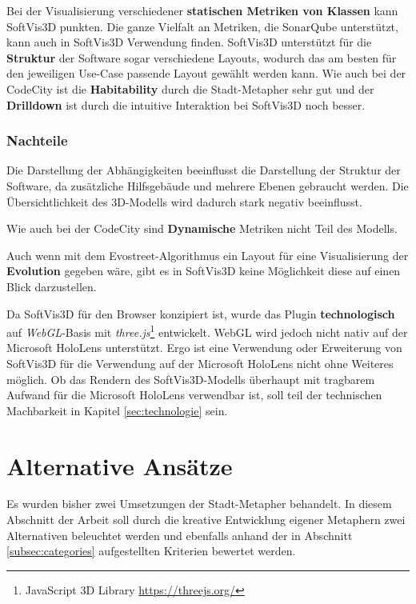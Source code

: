 Bei der Visualisierung verschiedener \textbf{statischen Metriken von Klassen} kann SoftVis3D punkten. Die ganze Vielfalt an Metriken, die SonarQube unterstützt, kann auch in SoftVis3D Verwendung finden. SoftVis3D unterstützt für die \textbf{Struktur} der Software sogar verschiedene Layouts, wodurch das am besten für den jeweiligen Use-Case passende Layout gewählt werden kann. Wie auch bei der CodeCity ist die \textbf{Habitability} durch die Stadt-Metapher sehr gut und der \textbf{Drilldown} ist durch die intuitive Interaktion bei SoftVis3D noch besser.

\subsubsection*{Nachteile}

Die Darstellung der Abhängigkeiten beeinflusst die Darstellung der Struktur der Software, da zusätzliche Hilfsgebäude und mehrere Ebenen gebraucht werden. Die Übersichtlichkeit des 3D-Modells wird dadurch stark negativ beeinflusst.

Wie auch bei der CodeCity sind \textbf{Dynamische} Metriken nicht Teil des Modells.

Auch wenn mit dem Evostreet-Algorithmus ein Layout für eine Visualisierung der \textbf{Evolution} gegeben wäre, gibt es in SoftVis3D keine Möglichkeit diese auf einen Blick darzustellen.

Da SoftVis3D für den Browser konzipiert ist, wurde das Plugin \textbf{technologisch} auf \textit{WebGL}-Basis mit \textit{three.js}\footnote{JavaScript 3D Library \url{https://threejs.org/}} entwickelt. WebGL wird jedoch nicht nativ auf der Microsoft HoloLens unterstützt. Ergo ist eine Verwendung oder Erweiterung von SoftVis3D für die Verwendung auf der Microsoft HoloLens nicht ohne Weiteres möglich. Ob das Rendern des SoftVis3D-Modells überhaupt mit tragbarem Aufwand für die Microsoft HoloLens verwendbar ist, soll teil der technischen Machbarkeit in Kapitel \ref{sec:technologie} sein.

\section{Alternative Ansätze}\label{sec:alternatives}
Es wurden bisher zwei Umsetzungen der Stadt-Metapher behandelt. In diesem Abschnitt der Arbeit soll durch die kreative Entwicklung eigener Metaphern zwei Alternativen beleuchtet werden und ebenfalls anhand der in Abschnitt \ref{subsec:categories} aufgestellten Kriterien bewertet werden.


